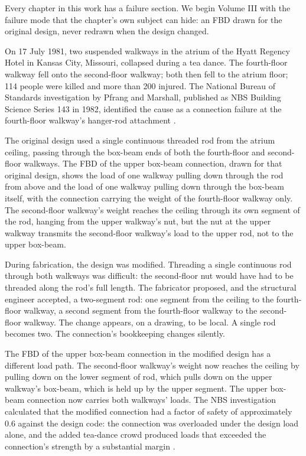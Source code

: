 Every chapter in this work has a failure section. We begin Volume III
with the failure mode that the chapter's own subject can hide: an FBD
drawn for the original design, never redrawn when the design changed.



On 17 July 1981, two suspended walkways in the atrium of the Hyatt
Regency Hotel in Kansas City, Missouri, collapsed during a tea
dance. The fourth-floor walkway fell onto the second-floor walkway;
both then fell to the atrium floor; 114 people were killed and more
than 200 injured. The National Bureau of Standards investigation by
Pfrang and Marshall, published as NBS Building Science Series 143 in
1982, identified the cause as a connection failure at the
fourth-floor walkway's hanger-rod attachment
\cite{acc:nbs-hyatt-1982}.

The original design used a single continuous threaded rod from the
atrium ceiling, passing through the box-beam ends of both the
fourth-floor and second-floor walkways. The FBD of the upper box-beam
connection, drawn for that original design, shows the load of one
walkway pulling down through the rod from above and the load of one
walkway pulling down through the box-beam itself, with the connection
carrying the weight of the fourth-floor walkway only. The second-floor
walkway's weight reaches the ceiling through its own segment of the
rod, hanging from the upper walkway's nut, but the nut at the upper
walkway transmits the second-floor walkway's load to the upper rod,
not to the upper box-beam.

During fabrication, the design was modified. Threading a single
continuous rod through both walkways was difficult: the second-floor
nut would have had to be threaded along the rod's full length. The
fabricator proposed, and the structural engineer accepted, a
two-segment rod: one segment from the ceiling to the fourth-floor
walkway, a second segment from the fourth-floor walkway to the
second-floor walkway. The change appears, on a drawing, to be local. A
single rod becomes two. The connection's bookkeeping changes silently.

The FBD of the upper box-beam connection in the modified design has a
different load path. The second-floor walkway's weight now reaches the
ceiling by pulling down on the lower segment of rod, which pulls down
on the upper walkway's box-beam, which is held up by the upper
segment. The upper box-beam connection now carries both walkways'
loads. The NBS investigation calculated that the modified connection
had a factor of safety of approximately $0.6$ against the design
code: the connection was overloaded under the design load alone, and
the added tea-dance crowd produced loads that exceeded the
connection's strength by a substantial margin
\cite{acc:nbs-hyatt-1982}.

